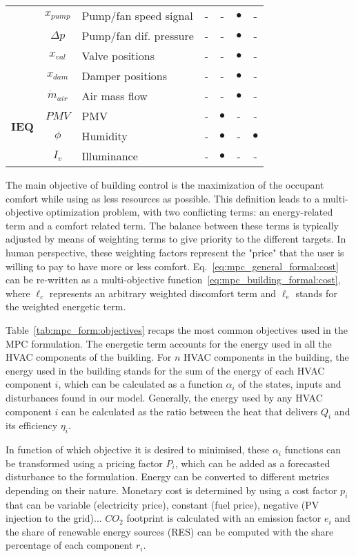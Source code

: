 \documentclass[10pt]{extarticle}
\begin{document}
\begin{table}[h]
\begin{tabular}{l|c|l|cccc}
		& $x_{pump}$ & Pump/fan speed signal & - & - & $\bullet$ & - \\
		& $\Delta p$ & Pump/fan dif. pressure & - & - & $\bullet$ & - \\
		& $x_{val}$ & Valve positions & - & - & $\bullet$ & - \\
		& $x_{dam}$ & Damper positions & - & - & $\bullet$ & - \\
		\midrule
		\multirow{4}{*}{\textbf{IEQ}} &
		$\dot{m}_{air}$ & Air mass flow & - & - & $\bullet$ & - \\
		& $PMV$ & PMV & - & $\bullet$ & - & - \\
		& $\phi$ & Humidity & - & $\bullet$ & - & $\bullet$ \\
		& $I_v$ & Illuminance & - & $\bullet$ & - & - \\
		\bottomrule 
	\end{tabular}
\end{table} 

The main objective of building control is the maximization of 
the occupant comfort while using as less resources as possible. 
This definition leads to a multi-objective optimization problem,
with two conflicting terms: an energy-related term and a comfort
related term. The balance between these terms is typically adjusted
by means of weighting terms to give priority to the different targets.
In human perspective, these weighting factors represent the "price"
that the user is willing to pay to have more or less comfort.
Eq.~\eqref{eq:mpc_general_formal:cost}
can be re-written as a multi-objective function~\eqref{eq:mpc_building_formal:cost},
where $\ell_c$ represents an arbitrary weighted discomfort term and $\ell_e$
stands for the weighted energetic term. 

Table~\ref{tab:mpc_form:objectives} recaps the most common objectives used 
in the MPC formulation. The energetic term accounts for the energy used in all
the HVAC components of the building. For $n$ HVAC components in the building, 
the energy used in the building stands for the sum of the energy of each
HVAC component $i$, which can be calculated as a function $\alpha_i$ of the states,
inputs and disturbances found in our model. Generally, the energy used by
any HVAC component $i$ can be calculated as the ratio between the heat that
delivers $Q_i$ and its efficiency $\eta_i$. 

In function of which objective it is desired to minimised, these $\alpha_i$
functions can be transformed using a pricing factor $P_i$, which can be added
as a forecasted disturbance to the formulation. Energy can be converted to
different metrics depending on their nature. Monetary cost is determined 
by using a cost factor $p_i$ that can be variable (electricity price),
constant (fuel price), negative (PV injection to the grid)... $CO_2$ footprint
is calculated with an emission factor $e_i$ and the share of renewable energy
sources (RES) can be computed with the share percentage of each component $r_i$.
 
\end{document}
